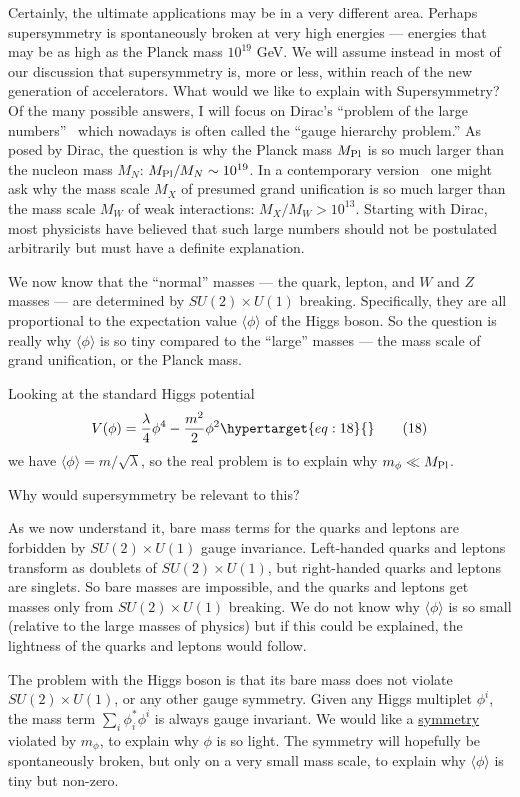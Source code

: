 \documentclass[11pt,a4paper]{article}
\newcommand{\eqtarget}[1]{\hypertarget{eq:#1}{\mathstrut}\tag{#1}}
\begin{document}
Certainly, the ultimate applications may be in a very different area.
Perhaps supersymmetry is spontaneously broken at very high
energies --- energies that may be as high as the Planck mass $10^{19}$ GeV.
We will assume instead in most of our discussion that supersymmetry
is, more or less, within reach of the new generation of accelerators.
What would we like to explain with Supersymmetry? Of the many
possible answers, I will focus on Dirac's ``problem of the large numbers''~\cite{ref7}
which nowadays is often called the ``gauge hierarchy problem.''
As posed by Dirac, the question is why the Planck mass $M_{\rm Pl}$ is so much
larger than the nucleon mass $M_N$: $M_{\rm Pl}/M_N \sim 10^{19}$. In a contemporary
version~\cite{ref8} one might ask why the mass scale $M_X$ of presumed grand unification
is so much larger than the mass scale $M_W$ of weak interactions:
$M_X/M_W > 10^{13}$. Starting with Dirac, most physicists have believed
that such large numbers should not be postulated arbitrarily
but must have a definite explanation.

We now know that the ``normal'' masses --- the quark, lepton, and
$W$ and $Z$ masses --- are determined by $SU(2) \times U(1)$ breaking. Specifically,
they are all proportional to the expectation value $\langle \phi \rangle$ of the
Higgs boson. So the question is really why $\langle \phi \rangle$ is so tiny compared
to the ``large'' masses --- the mass scale of grand unification, or the
Planck mass.

Looking at the standard Higgs potential
\begin{equation}
V(\phi) = \frac{\lambda}{4}\phi^4 - \frac{m^2}{2}\phi^2
\eqtarget{18}
\end{equation}
we have $\langle \phi \rangle = m/\sqrt{\lambda}$, so the real problem is to explain why $m_\phi \ll M_{\rm Pl}$.

Why would supersymmetry be relevant to this?

As we now understand it, bare mass terms for the quarks and
leptons are forbidden by $SU(2) \times U(1)$ gauge invariance. Left-handed
quarks and leptons transform as doublets of $SU(2) \times U(1)$, but right-handed
quarks and leptons are singlets. So bare masses are impossible,
and the quarks and leptons get masses only from $SU(2) \times U(1)$
breaking. We do not know why $\langle \phi \rangle$ is so small (relative to the large
masses of physics) but if this could be explained, the lightness of
the quarks and leptons would follow.

The problem with the Higgs boson is that its bare mass does not
violate $SU(2) \times U(1)$, or any other gauge symmetry. Given any Higgs
multiplet $\phi^i$, the mass term $\sum_i \phi_i^* \phi^i$ is always gauge invariant. We
would like a \underline{symmetry} violated by $m_\phi$, to explain why $\phi$ is so light.
The symmetry will hopefully be spontaneously broken, but only on a
very small mass scale, to explain why $\langle \phi \rangle$ is tiny but non-zero.
\end{document}
